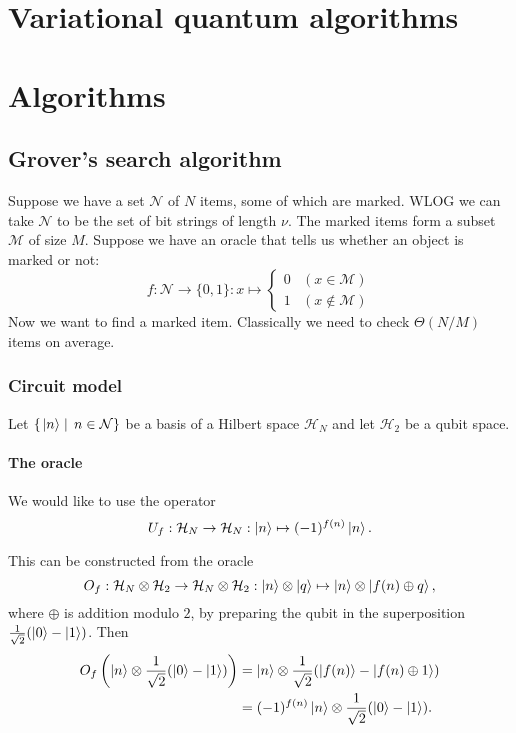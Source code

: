 \chapter{Variational quantum algorithms}

\chapter{Algorithms}
\section{Grover's search algorithm}
Suppose we have a set $\mathcal{N}$ of $N$ items, some of which are marked. WLOG we can take $\mathcal{N}$ to be the set of bit strings of length $\nu$. The marked items form a subset $\mathcal{M}$ of size $M$. Suppose we have an oracle that tells us whether an object is marked or not:
\[ f:\mathcal{N} \to \{0,1\}: x\mapsto \begin{cases}
0 & (x\in \mathcal{M}) \\
1 & (x\notin \mathcal{M})
\end{cases} \]
Now we want to find a marked item. Classically we need to check $\Theta(N/M)$ items on average.

\subsection{Circuit model}
Let $\left\{\left. \left| n \right\rangle \;\right|\; n\in\mathcal{N} \right\}$ be a basis of a Hilbert space $\mathcal{H}_N$ and let $\mathcal{H}_2$ be a qubit space.

\subsubsection{The oracle}
We would like to use the operator
\[ U_f: \mathcal{H}_N\to \mathcal{H}_N: \left| n \right\rangle\mapsto (-1)^{f(n)}\left| n \right\rangle. \]

This can be constructed from the oracle
\[ O_f: \mathcal{H}_N\otimes \mathcal{H}_2 \to \mathcal{H}_N\otimes \mathcal{H}_2: \left| n \right\rangle\otimes \left| q \right\rangle\mapsto \left| n \right\rangle\otimes\left| f(n)\oplus q \right\rangle, \]
where $\oplus$ is addition modulo $2$, by preparing the qubit in the superposition $\frac{1}{\sqrt{2}}(\left| 0 \right\rangle-\left| 1 \right\rangle)$. Then
\begin{align*}
O_f\left(\left| n \right\rangle\otimes \frac{1}{\sqrt{2}}(\left| 0 \right\rangle-\left| 1 \right\rangle)\right)
&= \left| n \right\rangle\otimes \frac{1}{\sqrt{2}}(\left| f(n) \right\rangle-\left| f(n)\oplus 1 \right\rangle) \\
&= (-1)^{f(n)}\left| n \right\rangle\otimes \frac{1}{\sqrt{2}}(\left| 0 \right\rangle-\left| 1 \right\rangle).
\end{align*}

